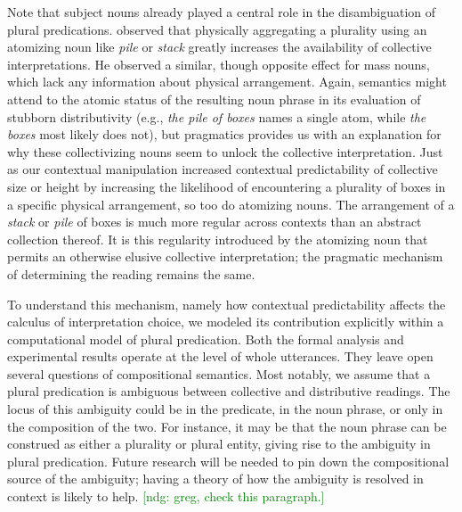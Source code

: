 \documentclass[linguex]{sp}
\newcommand{\ndg}[1]{\textcolor{Green}{[ndg: #1]}}
\newcommand{\gcs}[1]{\textcolor{blue}{[gcs: #1]}}
\begin{document}
Note that subject nouns already played a central role in the disambiguation of plural predications. \cite{schwarzschild2011} observed that physically aggregating a plurality using an atomizing noun like \emph{pile} or \emph{stack} greatly increases the availability of collective interpretations. He observed a similar, though opposite effect for mass nouns, which lack any information about physical arrangement. Again, semantics might attend to the atomic status of the resulting noun phrase in its evaluation of stubborn distributivity (e.g., \emph{the pile of boxes} names a single atom, while \emph{the boxes} most likely does not), but pragmatics provides us with an explanation for why these collectivizing nouns seem to unlock the collective interpretation. Just as our contextual manipulation increased contextual predictability of collective size or height by increasing the likelihood of encountering a plurality of boxes in a specific physical arrangement, so too do atomizing nouns. The arrangement of a \emph{stack} or \emph{pile} of boxes is much more regular across contexts than an abstract collection thereof. It is this regularity introduced by the atomizing noun that permits an otherwise elusive collective interpretation; the pragmatic mechanism of determining the reading remains the same.


To understand this mechanism, namely how contextual predictability affects the calculus of interpretation choice, we modeled its contribution explicitly within a computational model of plural predication. Both the formal analysis and experimental results operate at the level of whole utterances. They leave open several questions of compositional semantics. Most notably, we assume that a plural predication is ambiguous between collective and distributive readings. The locus of this ambiguity could be in the predicate, in the noun phrase, or only in the composition of the two. For instance, it may be that the noun phrase can be construed as either a plurality or plural entity, giving rise to the ambiguity in plural predication. Future research will be needed to pin down the compositional source of the ambiguity; having a theory of how the ambiguity is resolved in context is likely to help. \ndg{greg, check this paragraph.}
\end{document}
